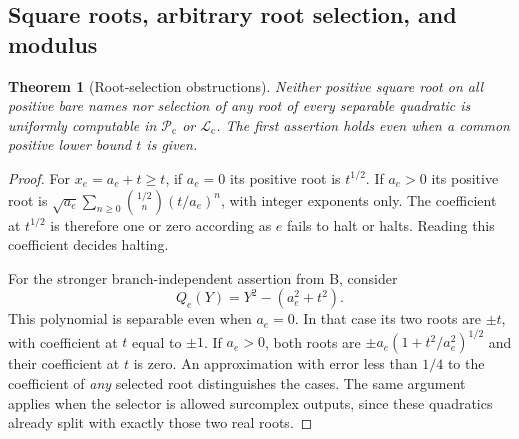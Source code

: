 \documentclass[11pt,letterpaper]{article}
\numberwithin{equation}{section}
\newtheorem{theorem}{Theorem}[section]
\theoremstyle{definition}
\theoremstyle{remark}
\newcommand{\Lc}{\mathcal L_{\mathrm c}}
\newcommand{\Pc}{\mathcal P_{\mathrm c}}
\begin{document}
\subsection{Square roots, arbitrary root selection, and modulus}
\begin{theorem}[Root-selection obstructions]\label{thm:root-obstructions}
Neither positive square root on all positive bare names nor selection of any
root of every separable quadratic is uniformly computable in $\Pc$ or $\Lc$.
The first assertion holds even when a common positive lower bound $t$ is given.
\end{theorem}
\begin{proof}
For $x_e=a_e+t\ge t$, if $a_e=0$ its positive root is $t^{1/2}$.
If $a_e>0$ its positive root is
$\sqrt{a_e}\sum_{n\ge0}\binom{1/2}{n}(t/a_e)^n$, with integer exponents only.
The coefficient at $t^{1/2}$ is therefore one or zero according as $e$ fails
to halt or halts. Reading this coefficient decides halting.

For the stronger branch-independent assertion from B, consider
\[
 Q_e(Y)=Y^2-(a_e^2+t^2).
\]
This polynomial is separable even when $a_e=0$. In that case its two roots
are $\pm t$, with coefficient at $t$ equal to $\pm1$. If $a_e>0$, both roots
are $\pm a_e(1+t^2/a_e^2)^{1/2}$ and their coefficient at $t$ is zero.
An approximation with error less than $1/4$ to the coefficient of
\emph{any} selected root distinguishes the cases. The same argument applies
when the selector is allowed surcomplex outputs, since these quadratics
already split with exactly those two real roots.
\end{proof}
\end{document}
